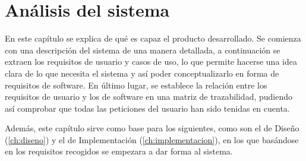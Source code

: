 \chapter{Análisis del sistema}
\label{ch:analisis}
En este capítulo se explica de qué es capaz el producto desarrollado. Se comienza con una descripción del sistema de una manera detallada, a continuación se extraen los requisitos de usuario y casos de uso, lo que permite hacerse una idea clara de lo que necesita el sistema y así poder conceptualizarlo en forma de requisitos de software. En último lugar, se establece la relación entre los requisitos de usuario y los de software en una matriz de trazabilidad, pudiendo así comprobar que todas las peticiones del usuario han sido tenidas en cuenta.

Además, este capítulo sirve como base para los siguientes, como son el de Diseño (\autoref{ch:diseno}) y el de Implementación (\autoref{ch:implementacion}), en los que basándose en los requisitos recogidos se empezara a dar forma al sistema.

